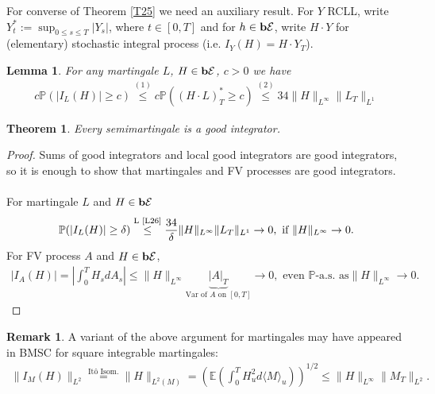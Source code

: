 \documentclass[12pt,a4paper, twoside]{article}
\newtheorem{lem}{Lemma}[section]
\newtheorem{thm}{Theorem}[section]
\theoremstyle{definition}
\newtheorem{rem}{Remark}[section]
\newcommand{\EE}{\mathbb{E}} %
\newcommand{\PP}{\mathbb{P}} %
\newcommand{\simple}{\textbf{\text{b}}\mathcal{E}}
\begin{document}
\newpage
For converse of Theorem \ref{T25} we need an auxiliary result. For $Y$ RCLL, write $Y_t^* := \sup_{0 \leq s \leq T} | Y_s|$, where $ t \in [0,T]$ and for $h \in \simple$, write $H \cdot Y$ for (elementary) stochastic integral process (i.e. $I_Y(H)= H \cdot Y_T$).
\begin{lem}\label{L26} For any martingale $L$,  $H \in \simple$, $c >0$ we have
\begin{align*}
c \PP(  | I_L(H)| \geq c) \overset{(1)}\leq c \PP( ( H \cdot L)_T^* \geq c) \overset{(2)}\leq 34 \|H\|_{L^\infty} \|L_T\|_{L^1}
\end{align*}
\end{lem}
\begin{thm} \label{T27} Every semimartingale is a good integrator. 
\end{thm}
\begin{proof}
Sums of good integrators and local good integrators are good integrators, so it is enough to show that martingales and FV processes are good integrators. 
\\\\
For martingale $L$ and $H \in \simple$ 
\begin{align*}
\PP(|I_L(H)| \geq \delta) \overset{\text{L \ref{L26}}}\leq \frac{34}{\delta} \|H\|_{L^\infty} \|L_T\|_{L^1} \to 0, \text{ if } \|H\|_{L^\infty} \to 0.
\end{align*}
For FV process $A$ and $H \in \simple$, 
\begin{align*}
|I_A(H)| = \left| \int_0^T H_s dA_s \right| \leq \| H\|_{L^\infty} \underbrace{|A|_T}_{\text{Var of $A$ on $[0,T]$}} \to 0, \text{ even } \PP\text{-a.s. as} \|H\|_{L^\infty} \to 0.
\end{align*}
\end{proof}
\begin{rem} A variant of the above argument for martingales may have appeared in BMSC for square integrable martingales:
\begin{align*}
\| I_M(H)\|_{L^2} \overset{\text{Itô Isom.}} = \|H\|_{L^2(M)} = \left( \EE \left( \int_0 ^T H_u^2 d \langle M \rangle_u \right) \right)^{1/2} \leq \|H\|_{L^\infty} \|M_T\|_{L^2}. 
\end{align*}
\end{rem}
\end{document}
